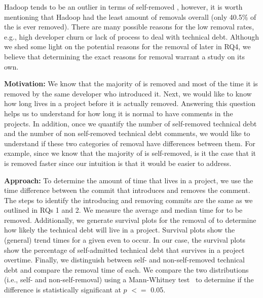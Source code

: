 Hadoop tends to be an outlier in terms of self-removed \SATD, however, it is worth mentioning that Hadoop had the least amount of removals overall (only 40.5\% of the \SATD is ever removed). There are many possible reasons for the low removal rates, e.g., high developer churn or lack of process to deal with technical debt. Although we shed some light on the potential reasons for the removal of \SATD later in RQ4, we believe that determining the exact reasons for \SATD removal warrant a study on its own.







\noindent\rqiii

\noindent \textbf{Motivation:} We know that the majority of \SATD is removed and most of the time it is removed by the same developer who introduced it. Next, we would like to know how long \SATD lives in a project before it is actually removed. Answering this question helps us to understand for how long it is normal to have \SATD comments in the projects. In addition, once we quantify the number of self-removed technical debt and the number of non self-removed technical debt comments, we would like to understand if these two categories of removal have differences between them. For example, since we know that the majority of \SATD is self-removed, is it the case that it is removed faster since our intuition is that it would be easier to address. 

\noindent \textbf{Approach:} To determine the amount of time that \SATD lives in a project, we use the time difference between the commit that introduces and removes the \SATD comment. The steps to identify the \SATD introducing and removing commits are the same as we outlined in RQs 1 and 2. We measure the average and median time for \SATD to be removed. Additionally, we generate survival plots for the removal of \SATD to determine how likely the technical debt will live in a project. Survival plots show the (general) trend times for a given even to occur. In our case, the survival plots show the  percentage of self-admitted technical debt that survives in a project overtime. Finally, we distinguish between self- and non-self-removed technical debt and compare the removal time of each. We compare the two distributions (i.e., self- and non-self-removal) using a Mann-Whitney test~\cite{mann1947test} to determine if the difference is statistically significant at $p$ $<$$=$ 0.05.

